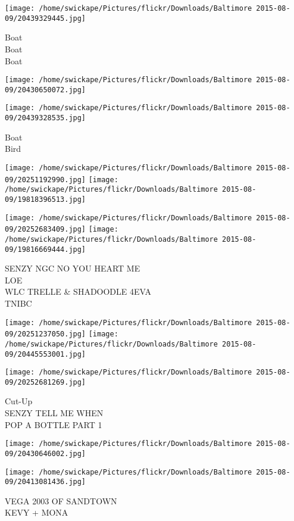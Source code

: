 \documentclass[10pt,letterpaper]{article}
\begin{document}
\vspace{0.25in}
\texttt{[image: /home/swickape/Pictures/flickr/Downloads/Baltimore 2015-08-09/20439329445.jpg]}

Boat\\
Boat\\
Boat
\pagebreak

\texttt{[image: /home/swickape/Pictures/flickr/Downloads/Baltimore 2015-08-09/20430650072.jpg]}

\vspace{0.25in}
\texttt{[image: /home/swickape/Pictures/flickr/Downloads/Baltimore 2015-08-09/20439328535.jpg]}

Boat\\
Bird
\pagebreak

\texttt{[image: /home/swickape/Pictures/flickr/Downloads/Baltimore 2015-08-09/20251192990.jpg]}
\texttt{[image: /home/swickape/Pictures/flickr/Downloads/Baltimore 2015-08-09/19818396513.jpg]}

\texttt{[image: /home/swickape/Pictures/flickr/Downloads/Baltimore 2015-08-09/20252683409.jpg]}
\texttt{[image: /home/swickape/Pictures/flickr/Downloads/Baltimore 2015-08-09/19816669444.jpg]}

SENZY NGC NO YOU HEART ME\\
LOE\\
WLC TRELLE \& SHADOODLE 4EVA\\
TNIBC
\pagebreak

\texttt{[image: /home/swickape/Pictures/flickr/Downloads/Baltimore 2015-08-09/20251237050.jpg]}
\texttt{[image: /home/swickape/Pictures/flickr/Downloads/Baltimore 2015-08-09/20445553001.jpg]}

\texttt{[image: /home/swickape/Pictures/flickr/Downloads/Baltimore 2015-08-09/20252681269.jpg]}

Cut{-}Up\\
SENZY TELL ME WHEN\\
POP A BOTTLE PART 1
\pagebreak

\texttt{[image: /home/swickape/Pictures/flickr/Downloads/Baltimore 2015-08-09/20430646002.jpg]}

\vspace{0.25in}
\texttt{[image: /home/swickape/Pictures/flickr/Downloads/Baltimore 2015-08-09/20413081436.jpg]}

VEGA 2003 OF SANDTOWN\\
KEVY + MONA
\pagebreak
\end{document}
